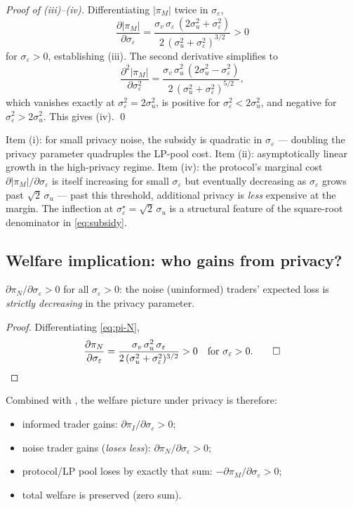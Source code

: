 \documentclass[runningheads]{llncs}
\newcommand{\sigv}{\sigma_v}
\newcommand{\sigu}{\sigma_u}
\newcommand{\sige}{\sigma_\varepsilon}
\begin{document}
\begin{proof}[Proof of (iii)--(iv)]
Differentiating $|\pi_M|$ twice in $\sige$,
\[
\frac{\partial |\pi_M|}{\partial \sige}
= \frac{\sigv\,\sige\,(2\sigu^2 + \sige^2)}{2\,(\sigu^2 + \sige^2)^{3/2}}
> 0
\]
for $\sige > 0$, establishing (iii). The second derivative simplifies
to
\[
\frac{\partial^2 |\pi_M|}{\partial \sige^2}
= \frac{\sigv\,\sigu^2\,(2\sigu^2 - \sige^2)}{2\,(\sigu^2 + \sige^2)^{5/2}},
\]
which vanishes exactly at $\sige^2 = 2\sigu^2$, is positive for
$\sige^2 < 2\sigu^2$, and negative for $\sige^2 > 2\sigu^2$. This
gives (iv). \qed
\end{proof}

Item (i): for small privacy noise, the subsidy is quadratic in
$\sige$ --- doubling the privacy parameter quadruples the LP-pool
cost. Item (ii): asymptotically linear growth in the high-privacy
regime. Item (iv): the protocol's marginal cost
$\partial|\pi_M|/\partial\sige$ is itself increasing for small
$\sige$ but eventually decreasing as $\sige$ grows past
$\sqrt{2}\,\sigu$ --- past this threshold, additional privacy is
\emph{less} expensive at the margin. The inflection at
$\sige^\star = \sqrt{2}\,\sigu$ is a structural feature of the
square-root denominator in \eqref{eq:subsidy}.

\subsection{Welfare implication: who gains from privacy?}

\begin{corollary}
\label{cor:noise-helped}
$\partial \pi_N / \partial \sige > 0$ for all $\sige > 0$: the
noise (uninformed) traders' expected loss is \emph{strictly
decreasing} in the privacy parameter.
\end{corollary}

\begin{proof}
Differentiating \eqref{eq:pi-N},
\[
\frac{\partial \pi_N}{\partial \sige}
= \frac{\sigv\,\sigu^2\,\sige}{2\,(\sigu^2 + \sige^2)^{3/2}} > 0
\quad\text{for } \sige > 0. \qed
\]
\end{proof}

Combined with , the welfare picture under privacy
is therefore:
\begin{itemize}[leftmargin=*]
\item informed trader gains: $\partial \pi_I / \partial \sige > 0$;
\item noise trader gains (\emph{loses less}): $\partial \pi_N /
\partial \sige > 0$;
\item protocol/LP pool loses by exactly that sum:
$-\partial \pi_M / \partial \sige > 0$;
\item total welfare is preserved (zero sum).
\end{itemize}
\end{document}
